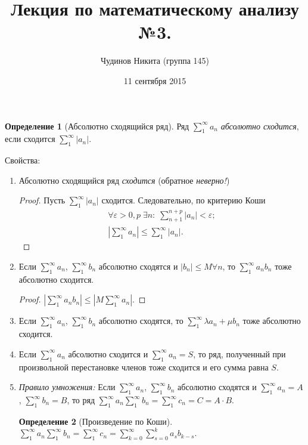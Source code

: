 \documentclass[a4paper,12pt]{article}
\theoremstyle{remark}
\theoremstyle{definition}
\newtheorem{definition}{Определение}
\begin{document}
\sloppy
\author{Чудинов Никита (группа 145)}
\date{11 сентября 2015}
\title{\vspace{-2.0cm}Лекция по математическому анализу №3.}
\frenchspacing
 
\maketitle

\begin{definition}[Абсолютно сходящийся ряд]
    Ряд \(\sum_1^\infty a_n\) \emph{абсолютно сходится}, если сходится \(\sum_1^\infty |a_n|\).
\end{definition}

Свойства:
\begin{enumerate}
    \item Абсолютно сходящийся ряд \emph{сходится} (обратное \emph{неверно!})
    \begin{proof}
        Пусть \(\sum_1^\infty |a_n|\) сходится. Следовательно, по критерию Коши 
        \begin{gather*}
            \forall \varepsilon > 0, p\; \exists n:\; \sum_{n+1}^{n+p} |a_n| < \varepsilon; \\
            \left| \sum_1^\infty a_n \right| \leqslant \sum_1^\infty |a_n|.
        \end{gather*}
    \end{proof}
    \item Если \(\sum_1^\infty a_n\), \(\sum_1^\infty b_n\) абсолютно сходятся и \(|b_n| \leqslant M \forall n\), то \(\sum_1^\infty a_n b_n\) тоже абсолютно сходится.
    \begin{proof}
        \(\left| \sum_1^\infty a_n b_n \right| \leqslant \left| M\sum_1^\infty a_n \right|\).
    \end{proof}
    \item Если \(\sum_1^\infty a_n\), \(\sum_1^\infty b_n\) абсолютно сходятся, то \(\sum_1^\infty \lambda a_n + \mu b_n\) тоже абсолютно сходится.
    \item Если \(\sum_1^\infty a_n\) абсолютно сходится и \(\sum_1^\infty a_n = S\), то ряд, полученный при произвольной перестановке членов тоже сходится и его сумма равна \(S\).
    \item \emph{Правило умножения:} Если \(\sum_1^\infty a_n\), \(\sum_1^\infty b_n\) абсолютно сходятся и \(\sum_1^\infty a_n = A\), \(\sum_1^\infty b_n = B\), то ряд \(\sum_1^\infty a_n \sum_1^\infty b_n = \sum_1^\infty c_n = C = A \cdot B\).
    \begin{definition}[Произведение по Коши]
        \(\sum_1^\infty a_n \sum_1^\infty b_n = \sum_1^\infty c_n = \sum_{k = 0}^\infty \sum_{s = 0}^k a_s b_{k-s}\).
    \end{definition}
\end{enumerate}
\end{document}

